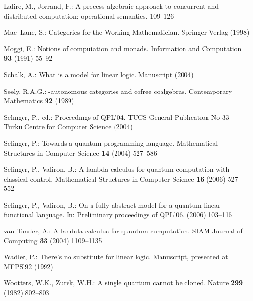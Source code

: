 \documentclass{llncs}
\begin{document}
\begin{thebibliography}{10}
Lalire, M., Jorrand, P.:
\newblock A process algebraic approach to concurrent and distributed
  computation: operational semantics.
\newblock  \cite{qpl04}  109--126

Mac~Lane, S.:
\newblock Categories for the Working Mathematician.
\newblock Springer Verlag (1998)

Moggi, E.:
\newblock Notions of computation and monads.
\newblock Information and Computation \textbf{93} (1991)  55--92

Schalk, A.:
\newblock What is a model for linear logic.
\newblock Manuscript (2004)

Seely, R.A.G.:
\newblock *-autonomous categories and cofree coalgebras.
\newblock Contemporary Mathematics \textbf{92} (1989)

Selinger, P., ed.:
\newblock Proceedings of QPL'04.
\newblock TUCS General Publication No 33, Turku Centre for Computer Science
  (2004)

Selinger, P.:
\newblock Towards a quantum programming language.
\newblock Mathematical Structures in Computer Science \textbf{14} (2004)
  527--586

Selinger, P., Valiron, B.:
\newblock A lambda calculus for quantum computation with classical control.
\newblock Mathematical Structures in Computer Science \textbf{16} (2006)
  527--552

Selinger, P., Valiron, B.:
\newblock On a fully abstract model for a quantum linear functional language.
\newblock In: Preliminary proceedings of QPL'06. (2006)  103--115

van Tonder, A.:
\newblock A lambda calculus for quantum computation.
\newblock SIAM Journal of Computing \textbf{33} (2004)  1109--1135

Wadler, P.:
\newblock There's no substitute for linear logic.
\newblock Manuscript, presented at MFPS'92 (1992)

Wootters, W.K., Zurek, W.H.:
\newblock A single quantum cannot be cloned.
\newblock Nature \textbf{299} (1982)  802--803

\end{thebibliography}
\end{document}
